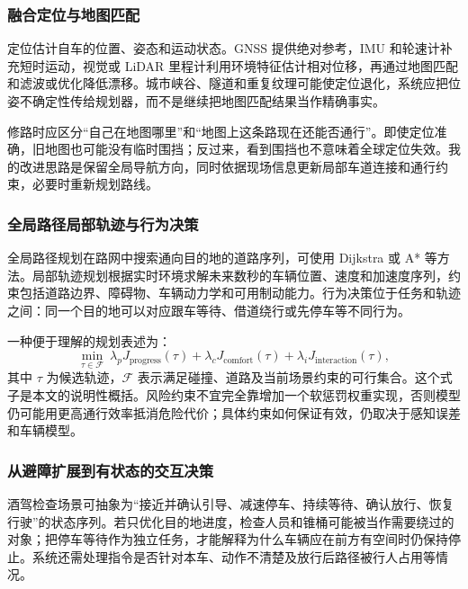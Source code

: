 \documentclass[UTF8,zihao=-4,fontset=windows]{ctexart}
\begin{document}
\subsubsection{融合定位与地图匹配}
定位估计自车的位置、姿态和运动状态。GNSS 提供绝对参考，IMU 和轮速计补充短时运动，视觉或 LiDAR 里程计利用环境特征估计相对位移，再通过地图匹配和滤波或优化降低漂移。城市峡谷、隧道和重复纹理可能使定位退化，系统应把位姿不确定性传给规划器，而不是继续把地图匹配结果当作精确事实。

修路时应区分“自己在地图哪里”和“地图上这条路现在还能否通行”。即使定位准确，旧地图也可能没有临时围挡；反过来，看到围挡也不意味着全球定位失效。我的改进思路是保留全局导航方向，同时依据现场信息更新局部车道连接和通行约束，必要时重新规划路线。
\subsubsection{全局路径局部轨迹与行为决策}
全局路径规划在路网中搜索通向目的地的道路序列，可使用 Dijkstra 或 A* 等方法。局部轨迹规划根据实时环境求解未来数秒的车辆位置、速度和加速度序列，约束包括道路边界、障碍物、车辆动力学和可用制动能力。行为决策位于任务和轨迹之间：同一个目的地可以对应跟车等待、借道绕行或先停车等不同行为。

一种便于理解的规划表述为：
\begin{equation}
\min_{\tau\in\mathcal F}\ \lambda_p J_{\mathrm{progress}}(\tau)+\lambda_c J_{\mathrm{comfort}}(\tau)+\lambda_i J_{\mathrm{interaction}}(\tau),
\end{equation}
其中 $\tau$ 为候选轨迹，$\mathcal F$ 表示满足碰撞、道路及当前场景约束的可行集合。这个式子是本文的说明性概括。风险约束不宜完全靠增加一个软惩罚权重实现，否则模型仍可能用更高通行效率抵消危险代价；具体约束如何保证有效，仍取决于感知误差和车辆模型。
\subsubsection{从避障扩展到有状态的交互决策}
酒驾检查场景可抽象为“接近并确认引导、减速停车、持续等待、确认放行、恢复行驶”的状态序列。若只优化目的地进度，检查人员和锥桶可能被当作需要绕过的对象；把停车等待作为独立任务，才能解释为什么车辆应在前方有空间时仍保持停止。系统还需处理指令是否针对本车、动作不清楚及放行后路径被行人占用等情况。
\end{document}
